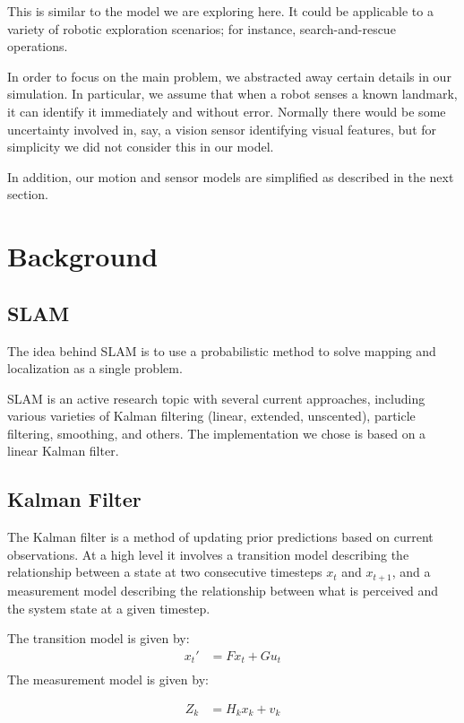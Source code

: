 \documentclass[prodmode,acmtecs]{acmsmall} %
\begin{document}
This is similar to the model we are exploring here.  It could be applicable to a variety of robotic exploration scenarios; for instance, search-and-rescue operations.

In order to focus on the main problem, we abstracted away certain details in our simulation.  In particular, we assume that when a robot senses a known landmark, it can identify it immediately and without error.  Normally there would be some uncertainty involved in, say, a vision sensor identifying visual features, but for simplicity we did not consider this in our model.

In addition, our motion and sensor models are simplified as described in the next section.

\section{Background}

\subsection{SLAM}

The idea behind SLAM is to use a probabilistic method to solve mapping and localization as a single problem. 

SLAM is an active research topic with several current approaches, including various varieties of Kalman filtering (linear, extended, unscented), particle filtering, smoothing, and others.  The implementation we chose is based on a linear Kalman filter.

\subsection{Kalman Filter}

The Kalman filter is a method of updating prior predictions based on current observations.  At a high level it involves a transition model describing the relationship between a state at two consecutive timesteps $x_t$ and $x_{t+1}$, and a measurement model describing the relationship between what is perceived and the system state at a given timestep.

The transition model is given by:
\begin{align*}
    x_t' &= F x_t + G u_t \\
\end{align*} The measurement model is given by:

\begin{align*}
    Z_k &= H_k x_k + v_k
\end{align*}
\end{document}
